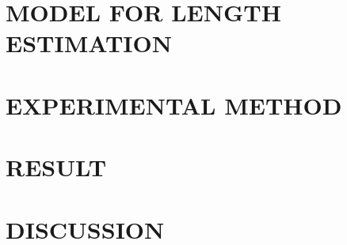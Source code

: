 \documentclass[letterpaper, 10 pt, conference]{IEEEconf}
\begin{document}
\section{MODEL FOR LENGTH ESTIMATION}


\section{EXPERIMENTAL METHOD}


\section{RESULT}


\section{DISCUSSION}




 \footnotesize
% 
% 
\end{document}

